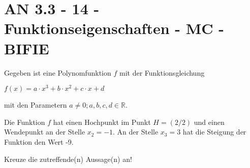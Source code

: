 \section{AN 3.3 - 14 - Funktionseigenschaften - MC - BIFIE}

\begin{beispiel}[AN 3.3]{1} %
				Gegeben ist eine Polynomfunktion $f$ mit der Funktionsgleichung \begin{center}$f(x)=a\cdot x^3+b\cdot x^2+c\cdot x+d$\end{center} mit den Parametern $a\neq 0;a,b,c,d\in\mathbb{R}$.
				
				Die Funktion $f$ hat einen Hochpunkt im Punkt $H=(2/2)$ und einen Wendepunkt an der Stelle $x_2=-1$. An der Stelle $x_3=3$ hat die Steigung der Funktion den Wert -9.
				
				Kreuze die zutreffende(n) Aussage(n) an!
\end{beispiel}